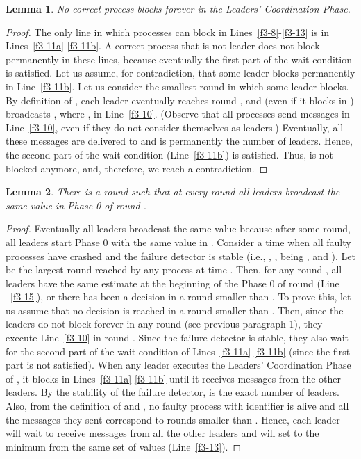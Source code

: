 \documentclass[10pt, conference, compsocconf]{IEEEtran}
\newtheorem{lemma}{Lemma}
\begin{document}
\begin{lemma} 
\label{no-block}
No correct process blocks forever in the Leaders' Coordination Phase.
\end{lemma} 
\begin{proof}
The only line in  which processes can block in Lines~\ref{f3-8}-\ref{f3-13}
is in Lines~\ref{f3-11a}-\ref{f3-11b}. A correct process that is not leader
does not  block permanently  in these lines,  because eventually  the first
part of  
the wait  condition is  satisfied. Let us  assume, for  contradiction, that
some leader  blocks permanently in  Line~\ref{f3-11b}. Let us  consider the
smallest round   in which some leader  blocks.  By definition of ,
each leader   eventually reaches  round , and  (even if it  blocks in
)   broadcasts  ,  where   ,  in
Line~\ref{f3-10}. (Observe that all processes send  messages  
in Line~\ref{f3-10}, even  if they do not consider  themselves as leaders.)
Eventually, all these messages are delivered to   
and   is permanently the  number of leaders.  Hence, the
second part  of the wait condition (Line~\ref{f3-11b})  is satisfied. Thus,
 is not blocked anymore, and, therefore, we reach a contradiction. 
\end{proof}


\begin{lemma} 
\label{same-value}
There  is a  round   such  that  at every  round  all  leaders
broadcast the same value in Phase 0 of round . 
\end{lemma} 
\begin{proof}
Eventually all leaders  broadcast the same value because  after some round,
all leaders start Phase 0 with the same value in . 
Consider  a time   when  all faulty  processes have  crashed  and the
failure detector  is stable (i.e.,  
, ,
 being , and ). 
Let  be  the largest round reached by any process  at time . Then,
for any round , all 
leaders  have the same estimate  at the beginning of the Phase 0
of round  (Line ~\ref{f3-15}), or  there has been a decision in a round
smaller than . To prove this, let us assume that no decision is reached
in a round smaller than . 
Then, since  the leaders do  not block forever  in any round  (see previous
paragraph  1),  they execute  Line~\ref{f3-10}  in  round  . Since  the
failure detector is stable, they also  wait for the second part of the wait
condition of  Lines~\ref{f3-11a}-\ref{f3-11b} (since the first  part is not
satisfied). 
When any  leader  executes the  Leaders' Coordination Phase  of , it
blocks    in     Lines~\ref{f3-11a}-\ref{f3-11b}    until    it    receives
 messages  from the other  leaders. By the  stability of
the   failure  detector,   is the  exact  number of
leaders. Also,  from the  definition of   and , no  faulty process
with  identifier   is alive  and  all the  messages they  sent
correspond to rounds smaller than . 
Hence, each  leader  will  wait to receive  messages from all  the other
leaders and  will set  to the  minimum from the same  set of values
(Line~\ref{f3-13}). 
\end{proof}
\end{document}
